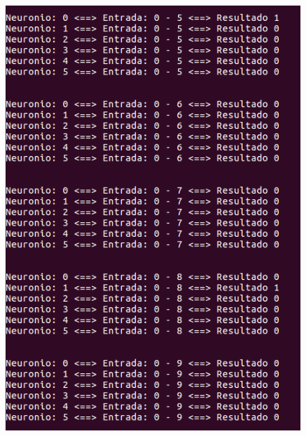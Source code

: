 \documentclass[hidelinks,12pt]{article}
\begin{document}
		\begin{figure}[!h]
			\centering
			\includegraphics[scale=0.5]{Figures/E3S0P2.png}
		\end{figure}
		
\end{document}
